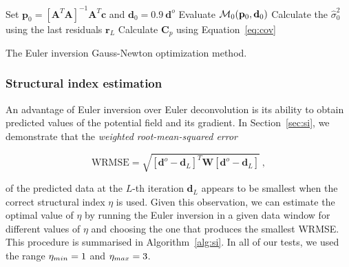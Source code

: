 \begin{algorithm}[!htb]
  Set
  $\mathbf{p}_0 = \left[\mathbf{A}^T\mathbf{A}\right]^{-1}\mathbf{A}^T\mathbf{c}$
  and $\mathbf{d}_0 = 0.9\ \mathbf{d}^o$
  \;
  Evaluate $\operatorname{\mathcal{M}}_0(\mathbf{p}_0, \mathbf{d}_0)$
  \;
  Calculate the $\hat{\sigma}_0^2$ using the last residuals $\mathbf{r}_L$
  \;
  Calculate $\mathbf{C}_p$ using Equation~\ref{eq:cov}
  \;
  \BlankLine
  \caption{The Euler inversion Gauss-Newton optimization method.}
  \label{alg:ei}
\end{algorithm}

\subsubsection{Structural index estimation}

An advantage of Euler inversion over Euler deconvolution is its ability to obtain
predicted values of the potential field and its gradient.
In Section~\ref{sec:si}, we demonstrate that the \textit{weighted root-mean-squared error}

\begin{equation}
    \text{WRMSE} = \sqrt{\left[\mathbf{d}^o - \mathbf{d}_L\right]^T\mathbf{W}\left[\mathbf{d}^o - \mathbf{d}_L\right]} \ ,
    \label{eq:wrmse}
\end{equation}

\noindent
of the predicted data at the $L$-th iteration $\mathbf{d}_L$
appears to be smallest when the correct structural index $\eta$ is used.
Given this observation, we can estimate the optimal value of $\eta$ by running
the Euler inversion in a given data window for different values of $\eta$ and
choosing the one that produces the smallest WRMSE.
This procedure is summarised in Algorithm~\ref{alg:si}.
In all of our tests, we used the range $\eta_{min} = 1$ and
$\eta_{max} = 3$.

